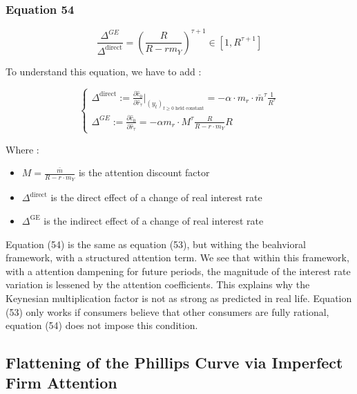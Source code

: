 \documentclass{article}
\begin{document}
\subsubsection*{Equation 54}

\begin{equation}\tag{54}
    \frac{\Delta^{GE}}{\Delta^{\text{direct}}}=\left(\frac{R}{R-rm_{Y}}\right)^{\tau+1}\in\left[1, R^{\tau+1}\right]
\end{equation}

To understand this equation, we have to add :

\begin{equation*}
    \begin{cases}
        \Delta^{\text{direct}}:=\frac{\partial \hat{c}_{0}}{\partial \hat{r}_{\tau}}\bigg\rvert_{(y_{t})_{t\geq0 \text{ held constant}}} = -\alpha\cdot m_{r}\cdot\bar{m}^{\tau}\frac{1}{R^{\tau}} \\
        \Delta^{GE}:=\frac{\partial \hat{c}_{0}}{\partial \hat{r}_{\tau}}=-\alpha m_{r}\cdot M^{\tau} \frac{R}{R-r\cdot m_{Y}}R 
    \end{cases}
\end{equation*}
    
Where : 
\begin{itemize}
    \item $M= \frac{\bar{m}}{R-r\cdot m_{Y}}$ is the attention discount factor
    \item $\Delta^{\text{direct}}$ is the direct effect of a change of real interest rate
    \item $\Delta^{\text{GE}}$ is the indirect effect of a change of real interest rate
\end{itemize}

Equation (54) is the same as equation (53), but withing the beahvioral framework, with a structured attention term. 
We see that within this framework, with a attention dampening for future periods, the magnitude of the interest rate variation is lessened by the attention coefficients. 
This explains why the Keynesian multiplication factor is not as strong as predicted in real life.
Equation (53) only works if consumers believe that other consumers are fully rational, equation (54) does not impose this condition. 

\subsection{Flattening of the Phillips Curve via Imperfect Firm Attention}
\end{document}
